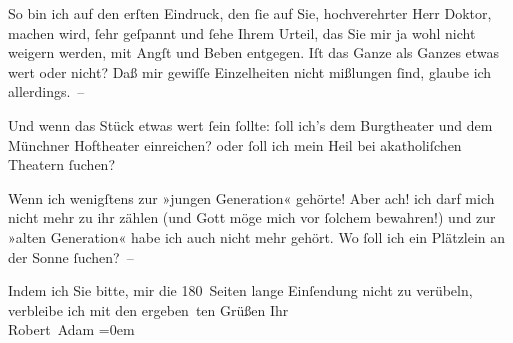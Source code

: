 \pstart
           So bin ich auf den erſten Eindruck, den{ }ſie auf Sie, hochverehrter Herr Doktor,
               machen wird,{ }ſehr geſpannt und{ }ſehe Ihrem Urteil, das Sie mir ja wohl nicht weigern
               werden, mit Angſt und Beben entgegen. Iſt das Ganze als Ganzes etwas wert oder nicht?
               Daß mir gewiſſe Einzelheiten nicht mißlungen{ }ſind, glaube ich allerdings. –\pend
           
\pstart
           Und wenn das Stück etwas wert {\pb}ſein{ }ſollte:{ }ſoll ich’s
               dem Burgtheater und dem Münchner Hoftheater einreichen? oder{ }ſoll ich mein Heil bei
               akatholiſchen Theatern{ }ſuchen?\pend
           
\pstart
           Wenn ich wenigſtens zur »jungen Generation« gehörte! Aber ach! ich darf mich nicht
               mehr zu ihr zählen (und Gott möge mich vor{ }ſolchem bewahren!) und zur »alten
               Generation« habe ich auch nicht mehr gehört. Wo{ }ſoll ich ein Plätzlein an der Sonne{ }ſuchen? –\pend
           
\pstart
           Indem ich Sie bitte, mir die 180 Seiten lange Einſendung nicht zu verübeln,
               verbleibe ich mit den ergeben ten Grüßen Ihr{\\[\baselineskip]}\spacefill\mbox{Robert Adam}\pend
           \leftskip=0em{}\endnumbering{}  \newcommand{\dateiname}{L02275}\newcommand{\titel}{Robert Adam an Arthur Schnitzler, 12. 10. 1917}\newcommand{\editorInnen}{Martin Anton Müller und Gerd-Hermann Susen}
